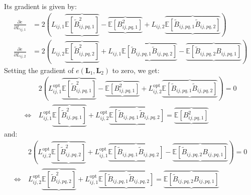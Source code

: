 \documentclass[12pt]{scrartcl}
\begin{document}
Its gradient is given by:
\begin{subequations}
\begin{align}
\frac{\partial e}{\partial L_{ij,1}} & = 2 \left(L_{ij,1} \underbrace{\overbrace{\mathbb{E}\left[\widetilde{B}_{ij,pq,1}^2\right]}} - \underbrace{\overbrace{\mathbb{E} \left[B^2_{ij,pq,1}\right]}} + L_{ij,2} \underbrace{\overbrace{\mathbb{E} \left[\widetilde{B}_{ij,pq,1} \widetilde{B}_{ij,pq,2}\right]}} \right)\\
\frac{\partial e}{\partial L_{ij,2}} & = 2 \left(L_{ij,2} \underbrace{\overbrace{\mathbb{E}\left[\widetilde{B}_{ij,pq,2}^2\right]}} + L_{ij,1} \underbrace{\overbrace{\mathbb{E} \left[\widetilde{B}_{ij,pq,1} \widetilde{B}_{ij,pq,2}\right]}} - \underbrace{\overbrace{\mathbb{E} \left[\widetilde{B}_{ij,pq,2} B_{ij,pq,1}\right]}} \right)
\end{align}
\end{subequations}
Setting the gradient of $e(\mathbf{L}_1,\mathbf{L}_2)$ to zero, we get:
\begin{align}
\label{eq:de_th_1_com}
& 2 \left(L_{ij,1}^\mathrm{opt} \underbrace{\overbrace{\mathbb{E}\left[\widetilde{B}_{ij,pq,1}^2\right]}} - \underbrace{\overbrace{\mathbb{E} \left[B^2_{ij,pq,1}\right]}} + L_{ij,2}^\mathrm{opt} \underbrace{\overbrace{\mathbb{E} \left[\widetilde{B}_{ij,pq,1} \widetilde{B}_{ij,pq,2}\right]}} \right) = 0 \nonumber \\
\Leftrightarrow \ & L_{ij,1}^\mathrm{opt} \underbrace{\overbrace{\mathbb{E}\left[\widetilde{B}_{ij,pq,1}^2\right]}} + L_{ij,2}^\mathrm{opt} \underbrace{\overbrace{\mathbb{E} \left[\widetilde{B}_{ij,pq,1} \widetilde{B}_{ij,pq,2}\right]}} = \underbrace{\overbrace{\mathbb{E} \left[B^2_{ij,pq,1}\right]}}
\end{align}
and:
\begin{align}
\label{eq:de_th_2_com}
& 2 \left(L_{ij,2}^\mathrm{opt} \underbrace{\overbrace{\mathbb{E}\left[\widetilde{B}_{ij,pq,2}^2\right]}} + L_{ij,1}^\mathrm{opt} \underbrace{\overbrace{\mathbb{E} \left[\widetilde{B}_{ij,pq,1} \widetilde{B}_{ij,pq,2}\right]}} - \underbrace{\overbrace{\mathbb{E} \left[\widetilde{B}_{ij,pq,2} B_{ij,pq,1}\right]}} \right) = 0 \nonumber \\
\Leftrightarrow \ & L_{ij,2}^\mathrm{opt} \underbrace{\overbrace{\mathbb{E}\left[\widetilde{B}_{ij,pq,2}^2\right]}} + L_{ij,1}^\mathrm{opt} \underbrace{\overbrace{\mathbb{E} \left[\widetilde{B}_{ij,pq,1} \widetilde{B}_{ij,pq,2}\right]}} = \underbrace{\overbrace{\mathbb{E} \left[\widetilde{B}_{ij,pq,2} B_{ij,pq,1}\right]}}
\end{align}
\end{document}
